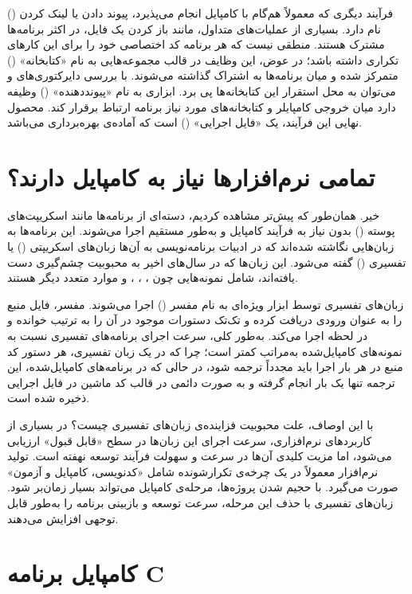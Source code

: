 فرآیند دیگری که معمولاً هم‌گام با کامپایل انجام می‌پذیرد، پیوند دادن یا لینک کردن () نام دارد. بسیاری از عملیات‌های متداول، مانند باز کردن یک فایل، در اکثر برنامه‌ها مشترک هستند. منطقی نیست که هر برنامه کد اختصاصی خود را برای این کارهای تکراری داشته باشد؛ در عوض، این وظایف در قالب مجموعه‌هایی به نام «کتابخانه» () متمرکز شده و میان برنامه‌ها به اشتراک گذاشته می‌شوند. با بررسی دایرکتوری‌های  و  می‌توان به محل استقرار این کتابخانه‌ها پی برد. ابزاری به نام «پیونددهنده» () وظیفه دارد میان خروجی کامپایلر و کتابخانه‌های مورد نیاز برنامه ارتباط برقرار کند. محصول نهایی این فرآیند، یک «فایل اجرایی» () است که آماده‌ی بهره‌برداری می‌باشد.

\section{تمامی نرم‌افزارها نیاز به کامپایل دارند؟}

خیر. همان‌طور که پیش‌تر مشاهده کردیم، دسته‌ای از برنامه‌ها مانند اسکریپت‌های پوسته () بدون نیاز به فرآیند کامپایل و به‌طور مستقیم اجرا می‌شوند. این برنامه‌ها به زبان‌هایی نگاشته شده‌اند که در ادبیات برنامه‌نویسی به آن‌ها زبان‌های اسکریپتی () یا تفسیری () گفته می‌شود. این زبان‌ها که در سال‌های اخیر به محبوبیت چشم‌گیری دست یافته‌اند، شامل نمونه‌هایی چون ، ، ،  و موارد متعدد دیگر هستند.

زبان‌های تفسیری توسط ابزار ویژه‌ای به نام مفسر () اجرا می‌شوند. مفسر، فایل منبع را به عنوان ورودی دریافت کرده و تک‌تک دستورات موجود در آن را به ترتیب خوانده و در لحظه اجرا می‌کند. به‌طور کلی، سرعت اجرای برنامه‌های تفسیری نسبت به نمونه‌های کامپایل‌شده به‌مراتب کمتر است؛ چرا که در یک زبان تفسیری، هر دستور کد منبع در هر بار اجرا باید مجدداً ترجمه شود، در حالی که در برنامه‌های کامپایل‌شده، این ترجمه تنها یک بار انجام گرفته و به صورت دائمی در قالب کد ماشین در فایل اجرایی ذخیره شده است.

با این اوصاف، علت محبوبیت فزاینده‌ی زبان‌های تفسیری چیست؟ در بسیاری از کاربردهای نرم‌افزاری، سرعت اجرای این زبان‌ها در سطح «قابل قبول» ارزیابی می‌شود، اما مزیت کلیدی آن‌ها در سرعت و سهولت فرآیند توسعه نهفته است. تولید نرم‌افزار معمولاً در یک چرخه‌ی تکرار‌شونده شامل «کدنویسی، کامپایل و آزمون» صورت می‌گیرد. با حجیم شدن پروژه‌ها، مرحله‌ی کامپایل می‌تواند بسیار زمان‌بر شود. زبان‌های تفسیری با حذف این مرحله، سرعت توسعه و بازبینی برنامه را به‌طور قابل توجهی افزایش می‌دهند.

\section{کامپایل برنامه C}

